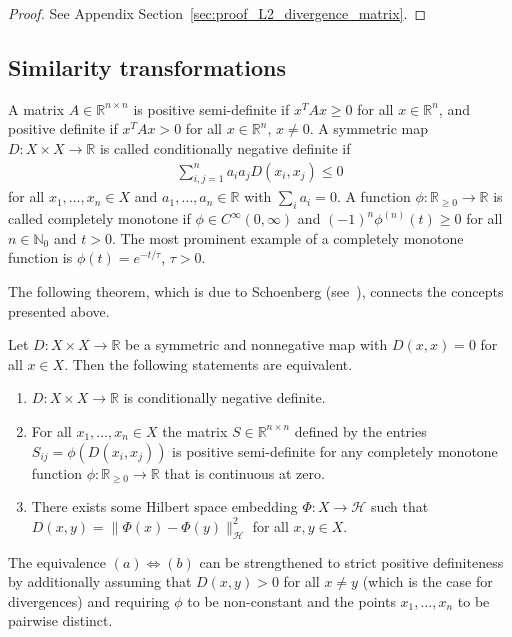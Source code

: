 \begin{proof}
    See Appendix Section~\ref{sec:proof_L2_divergence_matrix}.
\end{proof}

\subsection{Similarity transformations}\label{sec:similarity_transformations}

A matrix $A\in\mathbb{R}^{n\times n}$ is positive semi-definite if $x^TAx\ge0$ for all $x\in\mathbb{R}^n$, and positive definite if $x^TAx>0$ for all $x\in\mathbb{R}^n$, $x\ne0$. A symmetric map $D:X\times X\to\mathbb{R}$ is called conditionally negative definite if
\begin{align*}
    \sum_{i,j=1}^{n}a_ia_jD(x_i,x_j)\le0
\end{align*}
for all $x_1,\dots,x_n\in X$ and $a_1,\dots,a_n\in\mathbb{R}$ with $\sum_{i}a_i=0$. A function $\phi:\mathbb{R}_{\ge0}\to\mathbb{R}$ is called completely monotone if $\phi\in C^{\infty}(0,\infty)$ and $(-1)^{n}\phi^{(n)}(t)\ge 0$ for all $n\in\mathbb{N}_0$ and $t>0$. The most prominent example of a completely monotone function is $\phi(t)=e^{-t/\tau}$, $\tau>0$.

The following theorem, which is due to Schoenberg (see~\cite{berg_harmonic_1984}), connects the concepts presented above.

\begin{Thm}[Schoenberg]\label{thm:schoenberg}
    Let $D:X\times X\to\mathbb{R}$ be a symmetric and nonnegative map with $D(x,x)=0$ for all $x\in X$. Then the following statements are equivalent.
    \begin{enumerate}
        \item[(a)] $D:X\times X\to\mathbb{R}$ is conditionally negative definite.
        \item[(b)] For all $x_1,\dots,x_n\in X$ the matrix $S\in\mathbb{R}^{n\times n}$ defined by the entries $S_{ij}=\phi(D(x_i,x_j))$ is positive semi-definite for any completely monotone function $\phi:\mathbb{R}_{\ge0}\to\mathbb{R}$ that is continuous at zero.
        \item[(c)] There exists some Hilbert space embedding $\Phi:X\to\mathcal{H}$ such that $D(x,y)=\|\Phi(x)-\Phi(y)\|_{\mathcal{H}}^{2}$ for all $x,y\in X$.
    \end{enumerate}
    The equivalence $(a)\iff(b)$ can be strengthened to strict positive definiteness by additionally assuming that $D(x,y)>0$ for all $x\ne y$ (which is the case for divergences) and requiring $\phi$ to be non-constant and the points $x_1,\dots,x_n$ to be pairwise distinct.
\end{Thm}

